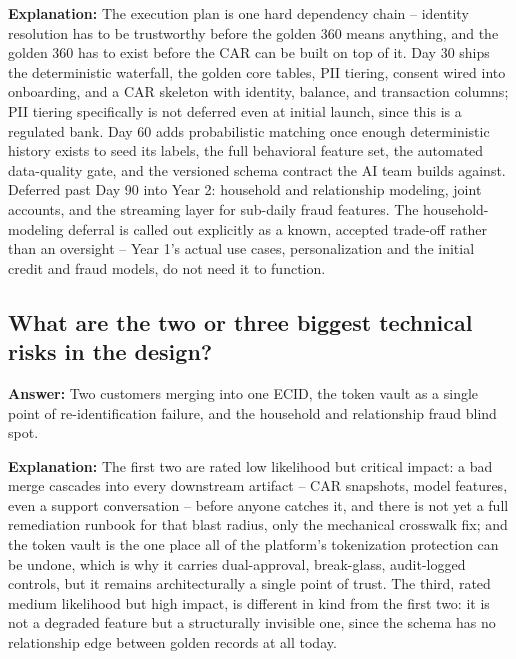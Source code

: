 \documentclass[11pt]{article}
\begin{document}
\textbf{Explanation:} The execution plan is one hard dependency chain -- identity resolution has to be trustworthy before the golden 360 means anything, and the golden 360 has to exist before the CAR can be built on top of it. Day 30 ships the deterministic waterfall, the golden core tables, PII tiering, consent wired into onboarding, and a CAR skeleton with identity, balance, and transaction columns; PII tiering specifically is not deferred even at initial launch, since this is a regulated bank. Day 60 adds probabilistic matching once enough deterministic history exists to seed its labels, the full behavioral feature set, the automated data-quality gate, and the versioned schema contract the AI team builds against. Deferred past Day 90 into Year 2: household and relationship modeling, joint accounts, and the streaming layer for sub-daily fraud features. The household-modeling deferral is called out explicitly as a known, accepted trade-off rather than an oversight -- Year 1's actual use cases, personalization and the initial credit and fraud models, do not need it to function.

\subsection{What are the two or three biggest technical risks in the design?}
\textbf{Answer:} Two customers merging into one ECID, the token vault as a single point of re-identification failure, and the household and relationship fraud blind spot.

\textbf{Explanation:} The first two are rated low likelihood but critical impact: a bad merge cascades into every downstream artifact -- CAR snapshots, model features, even a support conversation -- before anyone catches it, and there is not yet a full remediation runbook for that blast radius, only the mechanical crosswalk fix; and the token vault is the one place all of the platform's tokenization protection can be undone, which is why it carries dual-approval, break-glass, audit-logged controls, but it remains architecturally a single point of trust. The third, rated medium likelihood but high impact, is different in kind from the first two: it is not a degraded feature but a structurally invisible one, since the schema has no relationship edge between golden records at all today.
\end{document}
